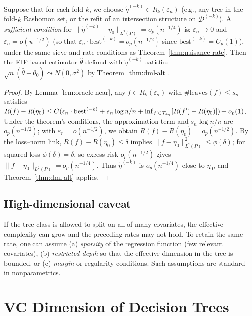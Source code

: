 \documentclass[12pt]{article}
\begin{document}
\begin{proposition}
\label{prop:rashomon-dml}
Suppose that for each fold $k$, we choose $\tilde{\eta}^{(-k)} \in R_k(\varepsilon_n)$ (e.g., any tree in the fold-$k$ Rashomon set, or the refit of an intersection structure on $\mathcal{D}^{(-k)}$). A \emph{sufficient condition} for $\|\tilde{\eta}^{(-k)} - \eta_0\|_{L^2(P)} = o_p(n^{-1/4})$ is: $\varepsilon_n \to 0$ and $\varepsilon_n = o(n^{-1/2})$ (so that $\varepsilon_n \cdot \text{best}^{(-k)} = o_p(n^{-1/2})$ since $\text{best}^{(-k)} = O_p(1)$), under the same sieve and rate conditions as Theorem~\ref{thm:nuisance-rate}. Then the EIF-based estimator $\hat\theta$ defined with $\tilde{\eta}^{(-k)}$ satisfies $\sqrt{n}(\hat\theta - \theta_0) \leadsto N(0, \sigma^2)$ by Theorem~\ref{thm:dml-alt}.
\end{proposition}
\begin{proof}
By Lemma~\ref{lem:oracle-near}, any $f \in R_k(\varepsilon_n)$ with $\#\text{leaves}(f) \le s_n$ satisfies $R(f) - R(\eta_0) \le C( \varepsilon_n \cdot \text{best}^{(-k)} + s_n \log n / n + \inf_{f' \in \mathcal{T}_{s_n}}[R(f') - R(\eta_0)] ) + o_p(1)$. Under the theorem's conditions, the approximation term and $s_n \log n / n$ are $o_p(n^{-1/2})$; with $\varepsilon_n = o(n^{-1/2})$, we obtain $R(f) - R(\eta_0) = o_p(n^{-1/2})$. By the loss--norm link, $R(f) - R(\eta_0) \le \delta$ implies $\|f - \eta_0\|_{L^2(P)}^2 \le \phi(\delta)$; for squared loss $\phi(\delta) = \delta$, so excess risk $o_p(n^{-1/2})$ gives $\|f - \eta_0\|_{L^2(P)} = o_p(n^{-1/4})$. Thus $\tilde{\eta}^{(-k)}$ is $o_p(n^{-1/4})$-close to $\eta_0$, and Theorem~\ref{thm:dml-alt} applies.
\end{proof}

\subsection{High-dimensional caveat}
If the tree class is allowed to split on all of many covariates, the effective complexity can grow and the preceding rates may not hold. To retain the same rate, one can assume (a) \emph{sparsity} of the regression function (few relevant covariates), (b) \emph{restricted depth} so that the effective dimension in the tree is bounded, or (c) \emph{margin} or regularity conditions. Such assumptions are standard in nonparametrics.

\section{VC Dimension of Decision Trees}
\label{app:vc-dimension}
\end{document}
